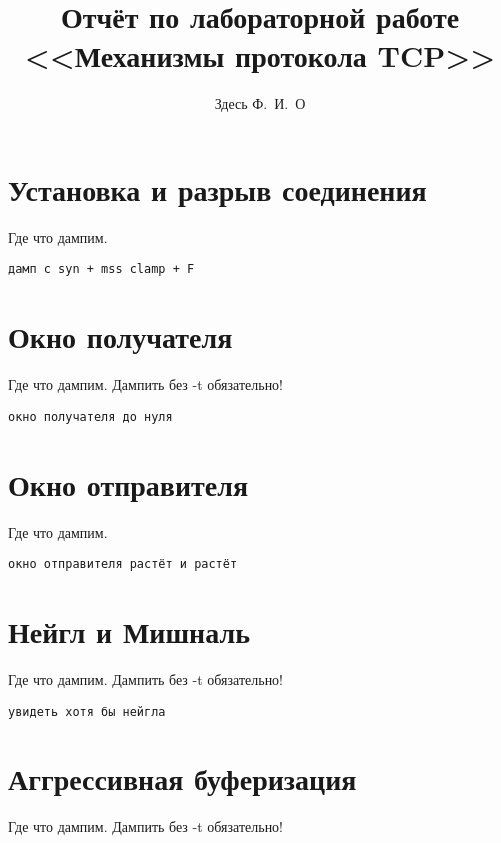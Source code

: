 \documentclass[a4paper,12pt]{article}
\title{Отчёт по лабораторной работе \\ <<Механизмы протокола TCP>>}
\author{Здесь Ф.~И.~О}
\begin{document}
\maketitle

\tableofcontents


\section{Установка и разрыв соединения}

Где что дампим.

\begin{Verbatim}
дамп с syn + mss clamp + F
\end{Verbatim}

\section{Окно получателя}

Где что дампим.  Дампить без -t обязательно!

\begin{Verbatim}
окно получателя до нуля
\end{Verbatim}

\section{Окно отправителя}

Где что дампим.

\begin{Verbatim}
окно отправителя растёт и растёт
\end{Verbatim}

\section{Нейгл и Мишналь}

Где что дампим.  Дампить без -t обязательно!

\begin{Verbatim}
увидеть хотя бы нейгла
\end{Verbatim}

\section{Аггрессивная буферизация}

Где что дампим.  Дампить без -t обязательно!
\end{document}
